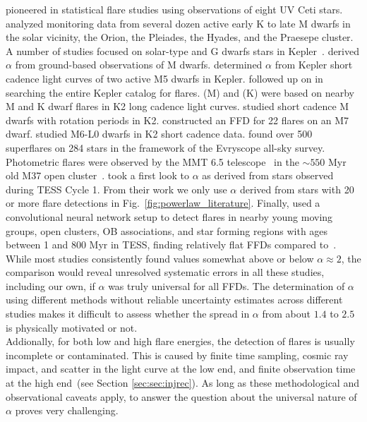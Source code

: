 \documentclass{aa}
\begin{document}
 \citet{lacy_uv_1976} pioneered in statistical flare studies using observations of eight UV Ceti stars. \citet{shakhovskaya_stellar_1989} analyzed monitoring data from several dozen active early K to late M dwarfs in the solar vicinity, the Orion, the Pleiades, the Hyades, and the Praesepe cluster. A number of studies focused on solar-type and G dwarfs stars in Kepler~\citep{shibayama2013,wu2015}. \citet{hilton2011} derived $\alpha$ from ground-based observations of M dwarfs. \citet{lurie2015} determined $\alpha$ from Kepler short cadence light curves of two active M5 dwarfs in Kepler. \citet{yang_flaring_2017} followed up on \citet{davenport_kepler_2016} in searching the entire Kepler catalog for flares. \citet{lin2019} (M) and (K) were based on nearby M and K dwarf flares in K2 long cadence light curves. \citet{raetz2020} studied short cadence M dwarfs with rotation periods in K2. \citet{gizis_k2_2017-1} constructed an FFD for 22 flares on an M7 dwarf. \citet{paudel2018} studied M6-L0 dwarfs in K2 short cadence data. \citet{howard2019} found over 500 superflares on 284 stars in the framework of the Evryscope all-sky survey. Photometric flares were observed by the MMT 6.5 telescope~\citep{hartman2008} in the $\sim550$ Myr old M37 open cluster~\citep{chang2015}. \citet{guenther2020} took a first look to $\alpha$ as derived from stars observed during TESS Cycle 1. From their work we only use $\alpha$ derived from stars with 20 or more flare detections in Fig.~\ref{fig:powerlaw_literature}. Finally, \citet{feinstein2020} used a convolutional neural network setup to detect flares in nearby young moving groups, open clusters, OB associations, and star forming regions with ages between 1 and 800 Myr in TESS, finding relatively flat FFDs compared to~\citet{guenther2020}.
       \\
While most studies consistently found values somewhat above or below $\alpha\approx2$, the comparison would reveal unresolved systematic errors in all these studies, including our own, if $\alpha$ was truly universal for all FFDs. The determination of $\alpha$ using different methods without reliable uncertainty estimates across different studies makes it difficult to assess whether the spread in $\alpha$ from about $1.4$ to $2.5$ is physically motivated or not. 
\\
Addionally, for both low and high flare energies, the detection of flares is usually incomplete or contaminated. This is caused by finite time sampling, cosmic ray impact, and scatter in the light curve at the low end, and finite observation time at the high end~(see Section \ref{sec:sec:injrec}). As long as these methodological and observational caveats apply, to answer the question about the universal nature of $\alpha$ proves very challenging.
\end{document}
